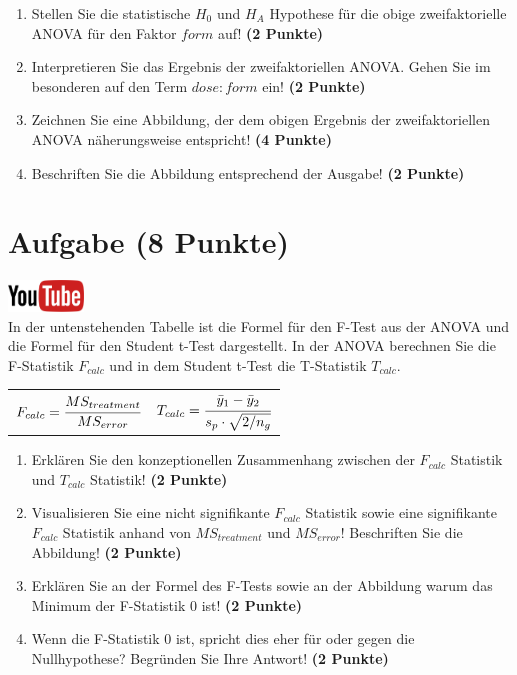\documentclass[a4paper, 9pt]{scrartcl}\usepackage[]{graphicx}\usepackage[]{xcolor}
\begin{document}
\begin{enumerate}
\item Stellen Sie die statistische $H_0$ und $H_A$ Hypothese f{\"u}r die obige
  zweifaktorielle ANOVA f{\"u}r den Faktor $form$
  auf! \textbf{(2 Punkte)}
\item Interpretieren Sie das Ergebnis der zweifaktoriellen ANOVA. Gehen Sie
  im besonderen auf den Term $dose:form$ ein! \textbf{(2 Punkte)}
\item Zeichnen Sie eine Abbildung, der dem obigen Ergebnis der
  zweifaktoriellen ANOVA n{\"a}herungsweise entspricht! \textbf{(4 Punkte)}
\item Beschriften Sie die Abbildung entsprechend der \Rlogo Ausgabe! \textbf{(2 Punkte)}
\end{enumerate}
 
\clearpage

\section{Aufgabe \hfill (8 Punkte)}


\hfill\href{https://youtu.be/FjjJXkFJfIY}{\includegraphics[width =
  2cm]{img/youtube}}\\[1Ex]


In der untenstehenden Tabelle ist die Formel f{\"u}r den F-Test aus der ANOVA
und die Formel f{\"u}r den Student t-Test dargestellt. In der ANOVA berechnen
Sie die F-Statistik $F_{calc}$ und in dem Student t-Test die T-Statistik
$T_{calc}$.

\begin{center}
  \begin{tabular}{cc}
    $F_{calc} = \cfrac{MS_{treatment}}{MS_{error}}$ & $T_{calc} = \cfrac{\bar{y}_1 - \bar{y}_2}{s_p \cdot \sqrt{2/n_g}}$\\
  \end{tabular}
\end{center}


\begin{enumerate}
\item Erkl{\"a}ren Sie den konzeptionellen Zusammenhang zwischen der $F_{calc}$
  Statistik und $T_{calc}$ Statistik! \textbf{(2 Punkte)}
\item Visualisieren Sie eine nicht signifikante $F_{calc}$ Statistik sowie
  eine signifikante $F_{calc}$ Statistik anhand von $MS_{treatment}$ und
  $MS_{error}$! Beschriften Sie die Abbildung! \textbf{(2 Punkte)}
\item Erkl{\"a}ren Sie an der Formel des F-Tests sowie an der Abbildung warum
  das Minimum der F-Statistik 0 ist! \textbf{(2 Punkte)}
\item Wenn die F-Statistik 0 ist, spricht dies eher f{\"u}r oder gegen die
  Nullhypothese? Begr{\"u}nden Sie Ihre Antwort! \textbf{(2 Punkte)}
\end{enumerate}
\end{document}

